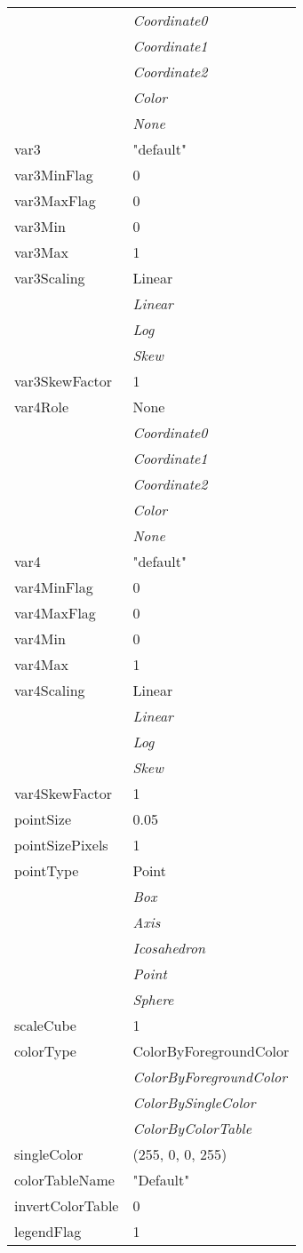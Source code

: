 \documentclass[10pt,a4paper]{report}
\begin{document}
\begin{longtable}{ll}
 & {\it  Coordinate0} \\
 & {\it  Coordinate1} \\
 & {\it  Coordinate2} \\
 & {\it  Color} \\
 & {\it  None} \\
var3  &  "default" \\
var3MinFlag  &  0 \\
var3MaxFlag  &  0 \\
var3Min  &  0 \\
var3Max  &  1 \\
var3Scaling  &  Linear   \\
 & {\it  Linear} \\
 & {\it  Log} \\
 & {\it  Skew} \\
var3SkewFactor  &  1 \\
var4Role  &  None   \\
 & {\it  Coordinate0} \\
 & {\it  Coordinate1} \\
 & {\it  Coordinate2} \\
 & {\it  Color} \\
 & {\it  None} \\
var4  &  "default" \\
var4MinFlag  &  0 \\
var4MaxFlag  &  0 \\
var4Min  &  0 \\
var4Max  &  1 \\
var4Scaling  &  Linear   \\
 & {\it  Linear} \\
 & {\it  Log} \\
 & {\it  Skew} \\
var4SkewFactor  &  1 \\
pointSize  &  0.05 \\
pointSizePixels  &  1 \\
pointType  &  Point   \\
 & {\it  Box} \\
 & {\it  Axis} \\
 & {\it  Icosahedron} \\
 & {\it  Point} \\
 & {\it  Sphere} \\
scaleCube  &  1 \\
colorType  &  ColorByForegroundColor   \\
 & {\it  ColorByForegroundColor} \\
 & {\it  ColorBySingleColor} \\
 & {\it  ColorByColorTable} \\
singleColor  &  (255, 0, 0, 255) \\
colorTableName  &  "Default" \\
invertColorTable  &  0 \\
legendFlag  &  1 \\
\end{longtable}
\end{document}

